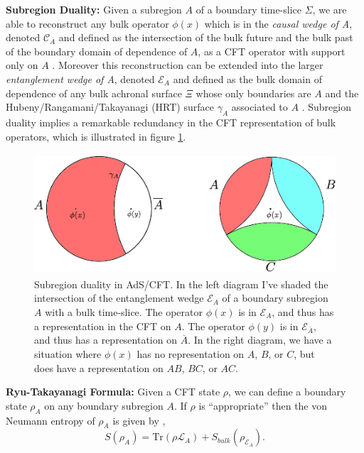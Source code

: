 \documentclass[12pt]{article}
\newcommand{\be}{\begin{equation}}
\newcommand{\ee}{\end{equation}}
\newcommand{\bfig}{\begin{figure}\begin{center}}
\newcommand{\efig}{\end{center}\end{figure}}
\newcommand{\Tr}{\mathrm{Tr}}
\newcommand{\Ll}{\mathcal{L}}
\newcommand{\LA}{\Ll_A}
\newcommand{\ol}{\overline}
\newcommand{\EA}{\mathcal{E}_A}
\begin{document}
\item\textbf{Subregion Duality:} Given a subregion $A$ of a boundary time-slice $\Sigma$, we are able to reconstruct any bulk operator $\phi(x)$ which is in the \textit{causal wedge of A}, denoted $\mathcal{C}_A$ and defined as the intersection of the bulk future and the bulk past of the boundary domain of dependence of $A$, as a CFT operator with support only on $A$ \cite{Hamilton:2006az,Morrison:2014jha,Bousso:2012sj,Czech:2012bh,Bousso:2012mh,Hubeny:2012wa}.  Moreover this reconstruction can be extended  \cite{Czech:2012bh,Wall:2012uf,Headrick:2014cta,Jafferis:2015del,Dong:2016eik} into the larger \textit{entanglement wedge of A}, denoted $\mathcal{E}_A$ and defined as the bulk domain of dependence of any bulk achronal surface $\Xi$ whose only boundaries are $A$ and the Hubeny/Rangamani/Takayanagi (HRT) surface $\gamma_A$ associated to $A$ \cite{Hubeny:2007xt}.  Subregion duality implies a remarkable redundancy in the CFT representation of bulk operators, which is illustrated in figure \ref{subregions}.
\bfig
\includegraphics[height=4.5cm]{subregions.pdf}
\caption{Subregion duality in AdS/CFT.  In the left diagram I've shaded the intersection of the entanglement wedge $\EA$ of a boundary subregion $A$ with a bulk time-slice.  The operator $\phi(x)$ is in $\EA$, and thus has a representation in the CFT on $A$. The operator $\phi(y)$ is in $\mathcal{E}_{\ol{A}}$, and thus has a representation on $\ol{A}$.  In the right diagram, we have a situation where $\phi(x)$ has no representation on $A$, $B$, or $C$, but does have a representation on $AB$, $BC$, or $AC$.}\label{subregions}
\efig
\item\textbf{Ryu-Takayanagi Formula:} Given a CFT state $\rho$, we can define a boundary state $\rho_A$ on any boundary subregion $A$.  If $\rho$ is ``appropriate'' then the von Neumann entropy of $\rho_A$ is given by \cite{Ryu:2006bv}, \cite{Hubeny:2007xt,Lewkowycz:2013nqa,Barrella:2013wja,Faulkner:2013ana}
\be\label{flm}
S(\rho_A)=\Tr \left(\rho \LA \right)+S_{bulk}(\rho_{\EA}).
\ee
\end{document}
